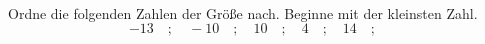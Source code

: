 \begin{aufgabe} ~ \\ 
Ordne die folgenden Zahlen der Gr\"o\ss{}e nach. Beginne mit der kleinsten Zahl.\[-13\quad ; \quad-10\quad ; \quad10\quad ; \quad4\quad ; \quad14\quad ; \quad\]\end{aufgabe} 
